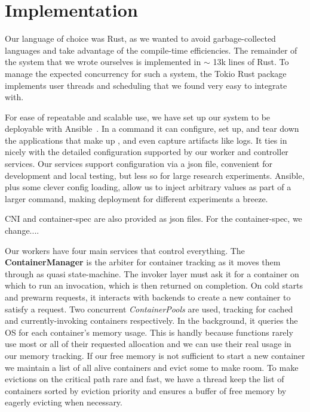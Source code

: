 \section{Implementation}

Our language of choice was Rust, as we wanted to avoid garbage-collected languages and take advantage of the compile-time efficiencies.
The remainder of the system that we wrote ourselves is implemented in $\sim$ 13k lines of Rust.
To manage the expected concurrency for such a system, the Tokio Rust package implements user threads and scheduling that we found very easy to integrate with.

For ease of repeatable and scalable use, we have set up our system to be deployable with Ansible~\cite{}.
In a command it can configure, set up, and tear down the applications that make up \sysname{}, and even capture artifacts like logs.
It ties in nicely with the detailed configuration supported by our worker and controller services.
Our services support configuration via a json file, convenient for development and local testing, but less so for large research experiments.
Ansible, plus some clever config loading, allow us to inject arbitrary values as part of a larger command, making deployment for different experiments a breeze.

CNI and container-spec are also provided as json files. For the container-spec, we change....

Our workers have four main services that control everything.
The \textbf{ContainerManager} is the arbiter for container tracking as it moves them through as quasi state-machine.
The invoker layer must ask it for a container on which to run an invocation, which is then returned on completion.
On cold starts and prewarm requests, it interacts with backends to create a new container to satisfy a request.
Two concurrent \emph{ContainerPools} are used, tracking for cached and currently-invoking containers respectively.
In the background, it queries the OS for each container's memory usage.
This is handly because functions rarely use most or all of their requested allocation and we can use their real usage in our memory tracking.
If our free memory is not sufficient to start a new container we maintain a list of all alive containers and evict some to make room.
To make evictions on the critical path rare and fast, we have a thread keep the list of containers sorted by eviction priority and ensures a buffer of free memory by eagerly evicting when necessary.

